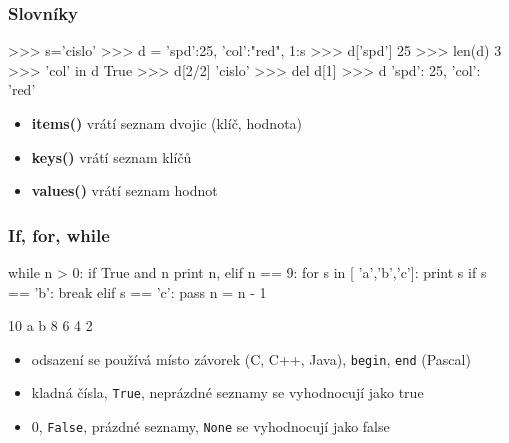 \documentclass[red,handout,professionalfont]{beamer}
\theoremstyle{definition}
\newcommand{\0}{\mbox{${\bf 0}$}}
\begin{document}
\begin{frame}[fragile]\frametitle{Slovníky}
\begin{minipage}{6.3cm}
  \begin{python}
>>> s='cislo'
>>> d = { 'spd':25, 'col':"red", 1:s }
>>> d['spd']
25
>>> len(d)
3
>>> 'col' in d
True
>>> d[2/2]
'cislo'
>>> del d[1]
>>> d
{'spd': 25, 'col': 'red'}    
  \end{python} 
\end{minipage}
\begin{minipage}{4cm}
{\small
\begin{itemize}
 \item[] {\bf items()} vrátí seznam dvojic (klíč, hodnota)
 \item[] {\bf keys()} vrátí seznam klíčů
 \item[] {\bf values()} vrátí seznam hodnot
\end{itemize}
}
\end{minipage}
\end{frame}

\begin{frame}[fragile]\frametitle{If, for, while}
\begin{minipage}{7cm}
\begin{python}
while n > 0:
  if True and n%
    print n,
  elif n == 9:
    for s in [ 'a','b','c']:
      print s
      if s == 'b':
        break
      elif s == 'c':
        pass
  n = n - 1
\end{python}\pause
\end{minipage}
\begin{minipage}{3cm}
\begin{python}
10 a
b
8 6 4 2
\end{python}\pause
\end{minipage}

\begin{itemize}
 \item odsazení se používá místo závorek (C, C++, Java), {\tt begin}, {\tt end} (Pascal)\pause
 \item kladná čísla, {\tt True}, neprázdné seznamy se vyhodnocují jako true\pause
 \item 0, {\tt False}, prázdné seznamy, {\tt None} se vyhodnocují jako false
\end{itemize}

\end{frame}
\end{document}
